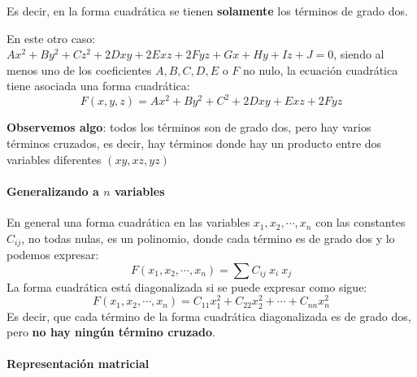 
Es decir, en la forma cuadrática se tienen \textbf{solamente} los términos de grado dos.

En este otro caso: \(Ax^2 + By^2+Cz^2+2Dxy+2Exz+2Fyz+Gx+Hy+Iz+J=0\), siendo al menos uno de los coeficientes \(A,B,C,D,E\) o \(F\) no nulo, la ecuación cuadrática tiene asociada una forma cuadrática:
\[
F(x,y,z) = Ax^2 + By^2 + C^2 + 2Dxy + Exz + 2Fyz
\]
\begin{tcolorbox}[myconclusion]
  \textbf{Observemos algo}: todos los términos son de grado dos, pero hay varios términos cruzados, es decir, hay términos donde hay un producto entre dos variables diferentes \((xy,xz,yz)\)
\end{tcolorbox}

\paragraph{Generalizando a \(n\) variables}

En general una forma cuadrática en las variables \(x_1,x_2,\cdots,x_n\) con las constantes \(C_{ij}\), no todas nulas, es un polinomio, donde cada término es de grado dos y lo podemos expresar:
\[
  F(x_1,x_2,\cdots,x_n) = \sum C_{ij} ~ x_i ~ x_j
\]
La forma cuadrática está diagonalizada si se puede expresar como sigue:
\[
  F(x_1,x_2,\cdots,x_n) = C_{11} x_1^2 + C_{22} x_2^2 + \cdots + C_{nn} x_n^2
\]
Es decir, que cada término de la forma cuadrática diagonalizada es de grado dos, pero \textbf{no hay ningún término cruzado}.

\paragraph{Representación matricial}

